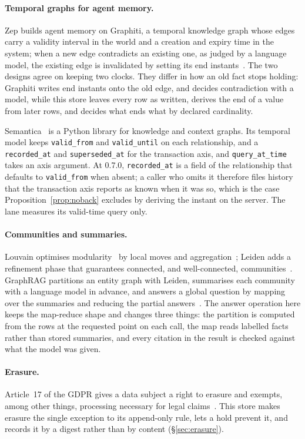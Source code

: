 \paragraph{Temporal graphs for agent memory.}
Zep builds agent memory on Graphiti, a temporal knowledge graph whose edges carry
a validity interval in the world and a creation and expiry time in the system;
when a new edge contradicts an existing one, as judged by a language model, the
existing edge is invalidated by setting its end
instants~\cite{rasmussen2025zep,graphiti}. The two designs agree on keeping two
clocks. They differ in how an old fact stops holding: Graphiti writes end
instants onto the old edge, and decides contradiction with a model, while this
store leaves every row as written, derives the end of a value from later rows,
and decides what ends what by declared cardinality.

Semantica~\cite{semantica} is a Python library for knowledge and context graphs.
Its temporal model keeps \texttt{valid\_from} and \texttt{valid\_until} on each
relationship, and a \texttt{recorded\_at} and \texttt{superseded\_at} for the
transaction axis, and \texttt{query\_at\_time} takes an axis argument. At
0.7.0, \texttt{recorded\_at} is a field of the relationship that defaults to
\texttt{valid\_from} when absent; a caller who omits it therefore files history
that the transaction axis reports as known when it was so, which is the case
Proposition~\ref{prop:noback} excludes by deriving the instant on the server. The
lane measures its valid-time query only.

\paragraph{Communities and summaries.}
Louvain optimises modularity~\cite{newman2004modularity} by local moves and
aggregation~\cite{blondel2008louvain}; Leiden adds a refinement phase that
guarantees connected, and well-connected, communities~\cite{traag2019leiden}.
GraphRAG partitions an entity graph with Leiden, summarises each community with a
language model in advance, and answers a global question by mapping over the
summaries and reducing the partial answers~\cite{edge2024graphrag}. The answer
operation here keeps the map-reduce shape and changes three things: the partition
is computed from the rows at the requested point on each call, the map reads
labelled facts rather than stored summaries, and every citation in the result is
checked against what the model was given.

\paragraph{Erasure.}
Article~17 of the GDPR gives a data subject a right to erasure and exempts, among
other things, processing necessary for legal claims~\cite{gdpr}. This store makes
erasure the single exception to its append-only rule, lets a hold prevent it, and
records it by a digest rather than by content (\S\ref{sec:erasure}).
